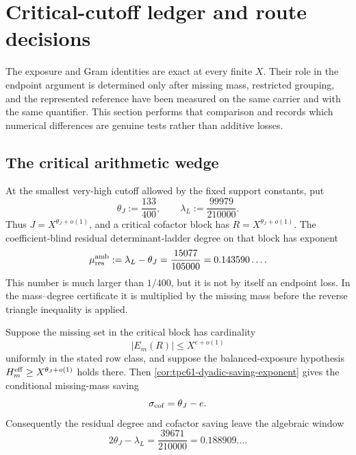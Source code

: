 \section{Critical-cutoff ledger and route decisions}
\label{sec:tpc61-endpoint-ledger}

The exposure and Gram identities are exact at every finite \(X\).  Their
role in the endpoint argument is determined only after missing mass,
restricted grouping, and the represented reference have been measured on
the same carrier and with the same quantifier.  This section performs that
comparison and records which numerical differences are genuine tests rather
than additive losses.

\subsection{The critical arithmetic wedge}

At the smallest very-high cutoff allowed by the fixed support constants, put
\begin{equation}
 \theta_J:=\frac{133}{400},
 \qquad
 \lambda_L:=\frac{99979}{210000}.
 \label{eq:tpc61-ledger-basic-exponents}
\end{equation}
Thus \(J=X^{\theta_J+o(1)}\), and a critical cofactor block has
\(R=X^{\theta_J+o(1)}\).  The coefficient-blind residual determinant-ladder
degree on that block has exponent
\begin{equation}
 \mu_{\rm res}^{\rm amb}
 :=\lambda_L-\theta_J
 =\frac{15077}{105000}
 =0.143590\ldots .
 \label{eq:tpc61-ledger-critical-residual-degree}
\end{equation}
This number is much larger than \(1/400\), but it is not by itself an
endpoint loss.  In the mass--degree certificate it is multiplied by the
missing mass before the reverse triangle inequality is applied.

Suppose the missing set in the critical block has cardinality
\begin{equation}
 |E_m(R)|\le X^{e+o(1)}
 \label{eq:tpc61-ledger-critical-missing-count}
\end{equation}
uniformly in the stated row class, and suppose the balanced-exposure
hypothesis \(H_m^{\rm eff}\ge X^{\theta_J+o(1)}\) holds there.  Then
\cref{cor:tpc61-dyadic-saving-exponent} gives the conditional missing-mass
saving
\begin{equation}
 \sigma_{\rm cof}=\theta_J-e.
 \label{eq:tpc61-ledger-critical-missing-saving}
\end{equation}
Consequently the residual degree and cofactor saving leave the algebraic
window
\begin{equation}
 \boxed{
 2\theta_J-\lambda_L
 =\frac{39671}{210000}
 =0.188909\ldots .}
 \label{eq:tpc61-ledger-residual-window}
\end{equation}

